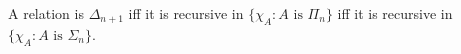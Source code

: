 A relation is $\Delta_{n+1}$ iff it is recursive in $\{\chi_A: A \text{ is } \Pi_n\}$ iff it is recursive in $\{\chi_A: A \text{ is } \Sigma_n\}$.